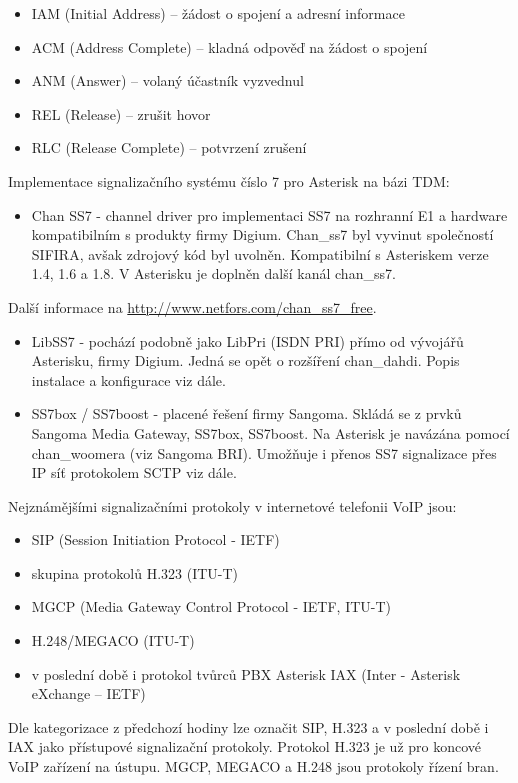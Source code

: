 \begin{itemize}[noitemsep]
    \item IAM (Initial Address) -- žádost o spojení a adresní informace
    \item ACM (Address Complete) -- kladná odpověď na žádost o spojení
    \item ANM (Answer) -- volaný účastník vyzvednul
    \item REL (Release) -- zrušit hovor
    \item RLC (Release Complete) -- potvrzení zrušení
\end{itemize}


Implementace signalizačního systému číslo 7 pro Asterisk na bázi TDM:
\begin{itemize}[noitemsep]
    \item Chan SS7 - channel driver pro implementaci SS7 na rozhranní E1 a hardware kompatibilním s produkty firmy Digium. Chan\_ss7 byl vyvinut společností SIFIRA, avšak zdrojový kód byl uvolněn. Kompatibilní s Asteriskem verze 1.4, 1.6 a 1.8. V Asterisku je doplněn další kanál chan\_ss7.
\end{itemize}

Další informace na \href{http://www.netfors.com/chan_ss7_free}{http://www.netfors.com/chan\_ss7\_free}.

\begin{itemize}[noitemsep]
    \item LibSS7 - pochází podobně jako LibPri (ISDN PRI) přímo od vývojářů Asterisku, firmy Digium. Jedná se opět o rozšíření chan\_dahdi. Popis instalace a konfigurace viz dále.
    \item SS7box / SS7boost - placené řešení firmy Sangoma. Skládá se z prvků Sangoma Media Gateway, SS7box, SS7boost. Na Asterisk je navázána pomocí chan\_woomera (viz Sangoma BRI). Umožňuje i přenos SS7 signalizace přes IP síť protokolem SCTP viz dále.
\end{itemize}


Nejznámějšími signalizačními protokoly v internetové telefonii VoIP jsou:
\begin{itemize}[noitemsep]
    \item SIP (Session Initiation Protocol - IETF)
    \item skupina protokolů H.323 (ITU-T)
    \item MGCP (Media Gateway Control Protocol - IETF, ITU-T)
    \item H.248/MEGACO (ITU-T)
    \item v poslední době i protokol tvůrců PBX Asterisk IAX (Inter - Asterisk eXchange -- IETF)
\end{itemize}
Dle kategorizace z předchozí hodiny lze označit SIP, H.323 a v poslední době i IAX jako přístupové signalizační protokoly. Protokol H.323 je už pro koncové VoIP zařízení na ústupu. MGCP, MEGACO a H.248 jsou protokoly řízení bran.

